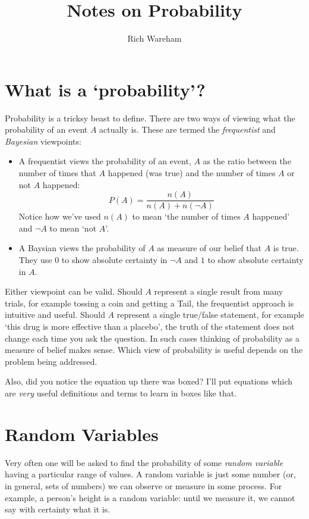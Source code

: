 \documentclass[a4paper]{article}
\title{Notes on Probability}
\author{Rich Wareham}
\begin{document}
\maketitle

\section{What is a `probability'?}

Probability is a tricksy beast to define. There are two ways of viewing what
the probability of an event $A$ actually is. These are termed the
\emph{frequentist} and \emph{Bayesian} viewpoints:

\begin{itemize}

\item A frequentist views the probability of an event, $A$ as the ratio between
the number of times that $A$ happened (was true) and the number of times $A$ or
not $A$ happened:
\[
\boxed{ P(A) = \frac{n(A)}{n(A) + n(\lnot A)} }
\]
Notice how we've used $n(A)$ to mean `the number of times $A$ happened' and
$\lnot A$ to mean `not $A$'.

\item A Baysian views the probability of $A$ as measure of our belief that $A$
is true. They use $0$ to show absolute certainty in $\lnot A$ and $1$ to show
absolute certainty in $A$.

\end{itemize}

Either viewpoint can be valid. Should $A$ represent a single result from many
trials, for example tossing a coin and getting a Tail, the frequentist approach
is intuitive and useful. Should $A$ represent a single true/false statement,
for example `this drug is more effective than a placebo', the truth of the
statement does not change each time you ask the question. In such cases
thinking of probability as a measure of belief makes sense. Which view of
probability is useful depends on the problem being addressed.

Also, did you notice the equation up there was boxed? I'll put equations which
are \emph{very} useful definitions and terms to learn in boxes like that.

\section{Random Variables}

Very often one will be asked to find the probability of some \emph{random
variable} having a particular range of values. A random variable is just some
number (or, in general, sets of numbers) we can observe or measure in some
process. For example, a person's height is a random variable: until we measure
it, we cannot say with certainty what it is.
\end{document}
